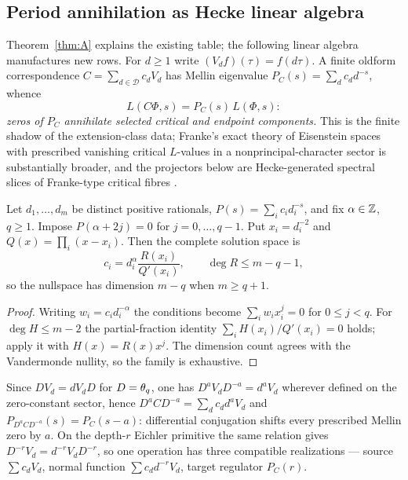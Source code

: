 \subsection{Period annihilation as Hecke linear algebra}\label{sec:hecke}

Theorem~\ref{thm:A} explains the existing table; the following linear algebra
manufactures new rows.  For $d\ge1$ write $(V_df)(\tau)=f(d\tau)$.  A finite
oldform correspondence $C=\sum_{d\in\mathcal D}c_dV_d$ has Mellin eigenvalue
$P_C(s)=\sum_dc_dd^{-s}$, whence
\begin{equation}\label{eq:mellin}
L(C\Phi,s)=P_C(s)\,L(\Phi,s):
\end{equation}
\emph{zeros of $P_C$ annihilate selected critical and endpoint components.}
This is the finite shadow of the extension-class data; Franke's exact theory of
Eisenstein spaces with prescribed vanishing critical $L$-values in a
nonprincipal-character sector is substantially broader, and the projectors
below are Hecke-generated spectral slices of Franke-type critical fibres
\cite{Franke2024}.

\begin{theorem}\label{thm:barycentric}
\Proved{} Let $d_1,\dots,d_m$ be distinct positive rationals, $P(s)=\sum_ic_id_i^{-s}$,
and fix $\alpha\in\mathbb{Z}$, $q\ge1$.  Impose $P(\alpha+2j)=0$ for
$j=0,\dots,q-1$.  Put $x_i=d_i^{-2}$ and $Q(x)=\prod_i(x-x_i)$.  Then the
complete solution space is
\[
\boxed{\ c_i=d_i^{\alpha}\frac{R(x_i)}{Q'(x_i)},\qquad \deg R\le m-q-1,\ }
\]
so the nullspace has dimension $m-q$ when $m\ge q+1$.
\end{theorem}

\begin{proof}
Writing $w_i=c_id_i^{-\alpha}$ the conditions become $\sum_iw_ix_i^j=0$ for
$0\le j<q$.  For $\deg H\le m-2$ the partial-fraction identity
$\sum_iH(x_i)/Q'(x_i)=0$ holds; apply it with $H(x)=R(x)x^j$.  The dimension
count agrees with the Vandermonde nullity, so the family is exhaustive.
\end{proof}

\begin{proposition}\label{prop:mellinshift}
\Proved{} Since $DV_d=dV_dD$ for $D=\theta_q$, one has $D^aV_dD^{-a}=d^aV_d$
wherever defined on the zero-constant sector, hence
$D^aCD^{-a}=\sum_dc_dd^aV_d$ and $P_{D^aCD^{-a}}(s)=P_C(s-a)$: differential
conjugation shifts every prescribed Mellin zero by $a$.  On the depth-$r$
Eichler primitive the same relation gives $D^{-r}V_d=d^{-r}V_dD^{-r}$, so one
operation has three compatible realizations --- source $\sum c_dV_d$, normal
function $\sum c_dd^{-r}V_d$, target regulator $P_C(r)$.
\end{proposition}

